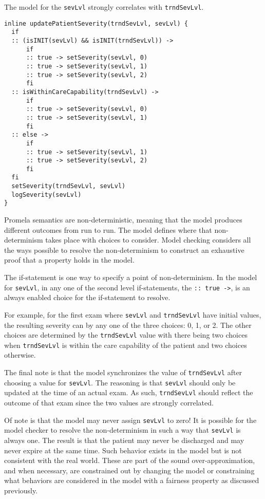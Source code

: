 The model for the \texttt{sevLvl} strongly correlates with \texttt{trndSevLvl}.
%
{\small
\begin{lstlisting}[style=myPromela]
inline updatePatientSeverity(trndSevLvl, sevLvl) {
  if
  :: (isINIT(sevLvl) && isINIT(trndSevLvl)) -> 
      if
      :: true -> setSeverity(sevLvl, 0)
      :: true -> setSeverity(sevLvl, 1)
      :: true -> setSeverity(sevLvl, 2)
      fi 
  :: isWithinCareCapability(trndSevLvl) -> 
      if
      :: true -> setSeverity(sevLvl, 0)
      :: true -> setSeverity(sevLvl, 1)
      fi
  :: else -> 
      if
      :: true -> setSeverity(sevLvl, 1)
      :: true -> setSeverity(sevLvl, 2)
      fi
  fi
  setSeverity(trndSevLvl, sevLvl)
  logSeverity(sevLvl)
}
\end{lstlisting}
}
%
\noindent Promela semantics are non-deterministic, meaning that the model produces different outcomes from run to run. The model defines where that non-determinism takes place with choices to consider. Model checking considers all the ways possible to resolve the non-determinism to construct an exhaustive proof that a property holds in the model. 

The if-statement is one way to specify a point of non-determinism. In the model for \texttt{sevLvl}, in any one of the second level if-statements, the \texttt{:: true ->}, is an always enabled choice for the if-statement to resolve. 

For example, for the first exam where \texttt{sevLvl} and \texttt{trndSevLvl} have initial values, the resulting severity can by any one of the three choices: 0, 1, or 2. The other choices are determined by the \texttt{trndSevLvl} value with there being two choices when \texttt{trndSevLvl} is within the care capability of the patient and two choices otherwise.

The final note is that the model synchronizes the value of \texttt{trndSevLvl} after choosing a value for \texttt{sevLvl}. The reasoning is that \texttt{sevLvl} should only be updated at the time of an actual exam. As such, \texttt{trndSevLvl} should reflect the outcome of that exam since the two values are strongly correlated.

Of note is that the model may never assign \texttt{sevLvl} to zero! It is possible for the model checker to resolve the non-determinism in such a way that \texttt{sevLvl} is always one. The result is that the patient may never be discharged and may never expire at the same time. Such behavior exists in the model but is not consistent with the real world. These are part of the sound over-approximation, and when necessary, are constrained out by changing the model or constraining what behaviors are considered in the model with a fairness property as discussed previously.

